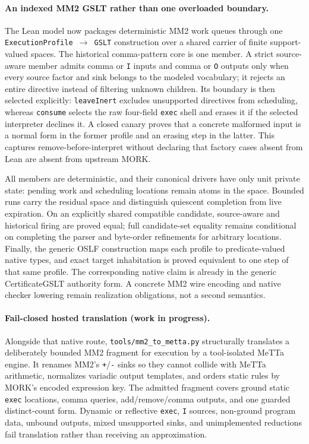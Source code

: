 \documentclass[11pt]{article}
\newcommand{\code}[1]{\texttt{#1}}
\begin{document}
\paragraph{An indexed MM2 GSLT rather than one overloaded boundary.}
The Lean model now packages deterministic MM2 work queues through one
\code{ExecutionProfile $\to$ GSLT} construction over a shared carrier of
finite support-valued spaces.  The historical comma-pattern core is one
member.  A strict source-aware member admits comma or \code{I} inputs and
comma or \code{O} outputs only when every source factor and sink belongs to
the modeled vocabulary; it rejects an entire directive instead of filtering
unknown children.  Its boundary is then selected explicitly:
\code{leaveInert} excludes unsupported directives from scheduling, whereas
\code{consume} selects the raw four-field \code{exec} shell and erases it if
the selected interpreter declines it.  A closed canary proves that a concrete
malformed input is a normal form in the former profile and an erasing step in
the latter.  This captures remove-before-interpret without declaring that
factory cases absent from Lean are absent from upstream MORK.

All members are deterministic, and their canonical drivers have only unit
private state: pending work and scheduling locations remain atoms in the
space.  Bounded runs carry the residual space and distinguish quiescent
completion from live expiration.  On an explicitly shared compatible
candidate, source-aware and historical firing are proved equal; full
candidate-set equality remains conditional on completing the parser and
byte-order refinements for arbitrary locations.  Finally, the generic OSLF
construction maps each profile to predicate-valued native types, and exact
target inhabitation is proved equivalent to one step of that same profile.
The corresponding native claim is already in the generic CertificateGSLT authority
form.  A concrete MM2 wire encoding and native checker lowering remain
realization obligations, not a second semantics.

\paragraph{Fail-closed hosted translation (work in progress).}
Alongside that native route, \code{tools/mm2\_to\_metta.py} structurally
translates a deliberately bounded MM2 fragment for execution by a
tool-isolated MeTTa engine.  It renames MM2's \code{+}/\code{-} sinks so they
cannot collide with MeTTa arithmetic, normalizes variadic output templates,
and orders static rules by MORK's encoded expression key.  The admitted
fragment covers ground static \code{exec} locations, comma queries,
add/remove/comma outputs, and one guarded distinct-count form.  Dynamic or
reflective \code{exec}, \code{I} sources, non-ground program data, unbound
outputs, mixed unsupported sinks, and unimplemented reductions fail
translation rather than receiving an approximation.
\end{document}
